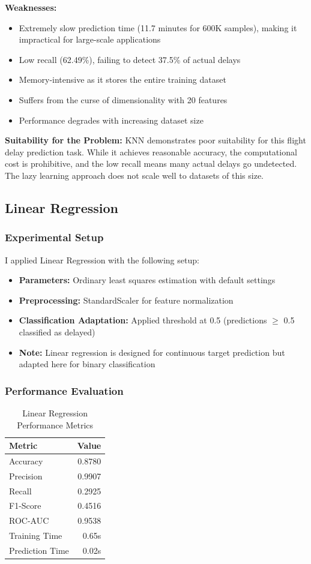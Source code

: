 \documentclass[sigconf]{acmart}
\begin{document}
\textbf{Weaknesses:}
\begin{itemize}
    \item Extremely slow prediction time (11.7 minutes for 600K samples), making it impractical for large-scale applications
    \item Low recall (62.49\%), failing to detect 37.5\% of actual delays
    \item Memory-intensive as it stores the entire training dataset
    \item Suffers from the curse of dimensionality with 20 features
    \item Performance degrades with increasing dataset size
\end{itemize}

\textbf{Suitability for the Problem:} KNN demonstrates poor suitability for this flight delay prediction task. While it achieves reasonable accuracy, the computational cost is prohibitive, and the low recall means many actual delays go undetected. The lazy learning approach does not scale well to datasets of this size.

\subsection{Linear Regression}

\subsubsection{Experimental Setup}
I applied Linear Regression with the following setup:
\begin{itemize}
    \item \textbf{Parameters:} Ordinary least squares estimation with default settings
    \item \textbf{Preprocessing:} StandardScaler for feature normalization
    \item \textbf{Classification Adaptation:} Applied threshold at 0.5 (predictions $\geq$ 0.5 classified as delayed)
    \item \textbf{Note:} Linear regression is designed for continuous target prediction but adapted here for binary classification
\end{itemize}

\subsubsection{Performance Evaluation}
\begin{table}[h]
\centering
\caption{Linear Regression Performance Metrics}
\begin{tabular}{lr}
\toprule
Metric & Value \\
\midrule
Accuracy & 0.8780 \\
Precision & 0.9907 \\
Recall & 0.2925 \\
F1-Score & 0.4516 \\
ROC-AUC & 0.9538 \\
Training Time & 0.65s \\
Prediction Time & 0.02s \\
\bottomrule
\end{tabular}
\end{table}
\end{document}
